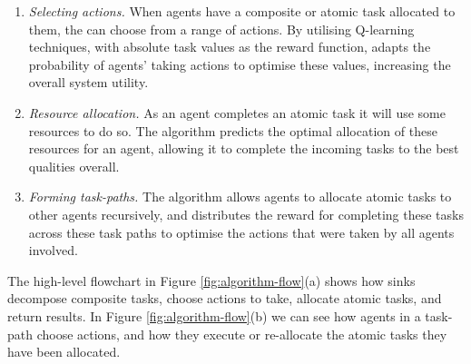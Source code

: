 \begin{enumerate}
	\item \textit{Selecting actions.} When agents have a composite or atomic task allocated to them, the can choose from a range of actions. By utilising Q-learning techniques, with absolute task values as the reward function, \acronymWSNOptimisation{}{} adapts the probability of agents' taking actions to optimise these values, increasing the overall system utility. 
	
	\item \textit{Resource allocation.} As an agent completes an atomic task it will use some resources to do so. The \acronymWSNOptimisation{}{} algorithm predicts the optimal allocation of these resources for an agent, allowing it to complete the incoming tasks to the best qualities overall.
	
	\item \textit{Forming task-paths. }The algorithm allows agents to allocate atomic tasks to other agents recursively, and distributes the reward for completing these tasks across these task paths to optimise the actions that were taken by all agents involved.
\end{enumerate}
The high-level flowchart in Figure \ref{fig:algorithm-flow}(a) shows how sinks decompose composite tasks, choose actions to take, allocate atomic tasks, and return results. In Figure \ref{fig:algorithm-flow}(b) we can see how agents in a task-path choose actions, and how they execute or re-allocate the atomic tasks they have been allocated.
